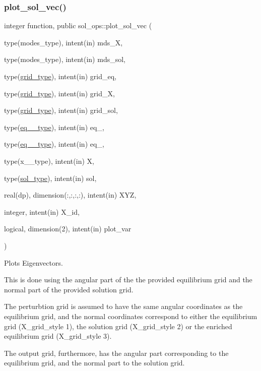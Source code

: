 \subsubsection{\texorpdfstring{plot\+\_\+sol\+\_\+vec()}{plot\_sol\_vec()}}
{\footnotesize\ttfamily integer function, public sol\+\_\+ops\+::plot\+\_\+sol\+\_\+vec (\begin{DoxyParamCaption}\item[{type(modes\+\_\+type), intent(in)}]{mds\+\_\+X,  }\item[{type(modes\+\_\+type), intent(in)}]{mds\+\_\+sol,  }\item[{type(\hyperlink{structgrid__vars_1_1grid__type}{grid\+\_\+type}), intent(in)}]{grid\+\_\+eq,  }\item[{type(\hyperlink{structgrid__vars_1_1grid__type}{grid\+\_\+type}), intent(in)}]{grid\+\_\+X,  }\item[{type(\hyperlink{structgrid__vars_1_1grid__type}{grid\+\_\+type}), intent(in)}]{grid\+\_\+sol,  }\item[{type(\hyperlink{structeq__vars_1_1eq__1__type}{eq\+\_\+1\+\_\+type}), intent(in)}]{eq\+\_,  }\item[{type(\hyperlink{structeq__vars_1_1eq__2__type}{eq\+\_\+2\+\_\+type}), intent(in)}]{eq\+\_,  }\item[{type(x\+\_\+1\+\_\+type), intent(in)}]{X,  }\item[{type(\hyperlink{structsol__vars_1_1sol__type}{sol\+\_\+type}), intent(in)}]{sol,  }\item[{real(dp), dimension(\+:,\+:,\+:,\+:), intent(in)}]{X\+YZ,  }\item[{integer, intent(in)}]{X\+\_\+id,  }\item[{logical, dimension(2), intent(in)}]{plot\+\_\+var }\end{DoxyParamCaption})}



Plots Eigenvectors. 

This is done using the angular part of the the provided equilibrium grid and the normal part of the provided solution grid.

The perturbtion grid is assumed to have the same angular coordinates as the equilibrium grid, and the normal coordinates correspond to either the equilibrium grid ({\ttfamily X\+\_\+grid\+\_\+style} 1), the solution grid ({\ttfamily X\+\_\+grid\+\_\+style} 2) or the enriched equilibrium grid ({\ttfamily X\+\_\+grid\+\_\+style} 3).

The output grid, furthermore, has the angular part corresponding to the equilibrium grid, and the normal part to the solution grid.

